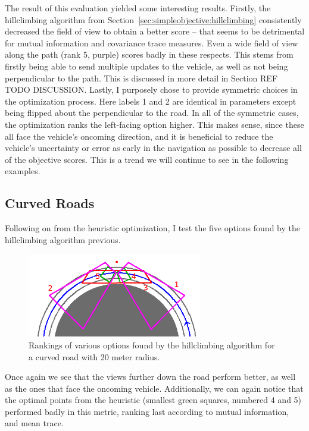 \documentclass[a4paper,12pt,twoside,openright]{report}
\begin{document}
The result of this evaluation yielded some interesting results. Firstly, the hillclimbing
algorithm from Section~\ref{sec:simpleobjective:hillclimbing} consistently decreased
the field of view to obtain a better score -- that seems to be detrimental
for mutual information and covariance trace measures. Even a wide field of view
along the path (rank 5, purple) scores badly in these respects. This stems
from firstly being able to send multiple updates to the vehicle, as well as
not being perpendicular to the path. This is discussed in more detail
in Section REF TODO DISCUSSION. Lastly, I purposely chose to provide symmetric
choices in the optimization process. Here labels 1 and 2 are identical in
parameters except being flipped about the perpendicular to the road. In all
of the symmetric cases, the optimization ranks the left-facing option higher.
This makes sense, since these all face the vehicle's oncoming direction, 
and it is beneficial to reduce the vehicle's uncertainty or error as 
early in the navigation as possible to decrease all of the objective scores.
This is a trend we will continue to see in the following examples.

\subsection{Curved Roads}

Following on from the heuristic optimization, I test the five options
found by the hillclimbing algorithm previous.

\begin{figure}[htb]
    \centering
    \includegraphics[width=3in]{figures/hillclimb_curvature_MI_eval.png}
    \caption[Single Camera Optimization Using MI on Curved Road]{Rankings of various options found by the hillclimbing algorithm
    for a curved road with 20 meter radius.}
    \label{fig:complexobjective:curve}
\end{figure}

Once again we see that the views further down the road perform better, as well as the ones
that face the oncoming vehicle. Additionally, we can again notice
that the optimal points from the heuristic (smallest green squares, numbered 4 and 5)
performed badly in this metric, ranking last according to mutual information,
and mean trace.
\end{document}
